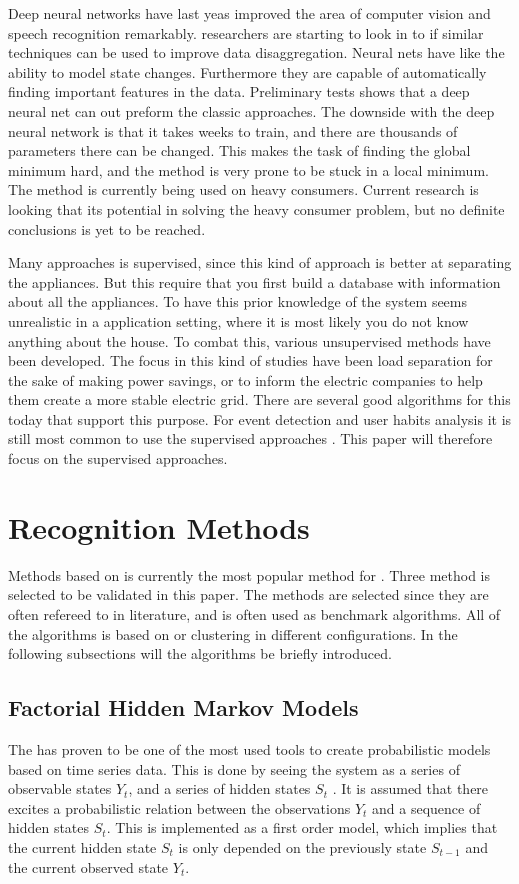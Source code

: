 Deep neural networks have last yeas improved the area of computer vision and speech recognition remarkably.  researchers are starting to look in to if similar techniques can be used to improve data disaggregation. Neural nets have like  the ability to model state changes. Furthermore they are capable of automatically finding important features in the data. Preliminary tests shows that a deep neural net can out preform the classic  approaches. The downside with the deep neural network is that it takes weeks to train, and there are thousands of parameters there can be changed. This makes the task of finding the global minimum hard, and the method is very prone to be stuck in a local minimum. The method is currently being used on heavy consumers\citep{RefWorks:25}. Current research is looking that its potential in solving the heavy consumer problem, but no definite conclusions is yet to be reached. 

Many approaches is supervised, since this kind of approach is better at separating the appliances. But this require that you first build a database with information about all the appliances. To have this prior knowledge of the system seems unrealistic in a application setting, where it is most likely you do not know anything about the house. To combat this, various unsupervised methods have been developed. The focus in this kind of studies have been load separation for the sake of making power savings, or to inform the electric companies to help them create a more stable electric grid. There are several good algorithms for this today that support this purpose. For event detection and user habits analysis it is still most common to use the supervised approaches \citep{RefWorks:19}. This paper will therefore focus on the supervised approaches. 

\newpage
			

\section{Recognition Methods}
\label{RecognitionMethods}
Methods based on  is currently the most popular method for . Three method is selected to be validated in this paper. The methods are selected since they are often refereed to in literature, and is often used as benchmark algorithms. All of the algorithms is based on  or clustering in different configurations. In the following subsections will the algorithms be briefly introduced. 

\subsection{Factorial Hidden Markov Models}
The  has proven to be one of the most used tools to create probabilistic models based on time series data. This is done by seeing the system as a series of observable states $Y_t$, and a series of hidden states $S_t$ \citep{RefWorks:20}. It is assumed that there excites a probabilistic relation between the observations $Y_t$ and a sequence of hidden states $S_t$. This is implemented as a first order model, which implies that the current hidden state $S_t$ is only depended on the previously state $S_{t-1}$ and the current observed state $Y_t$.

